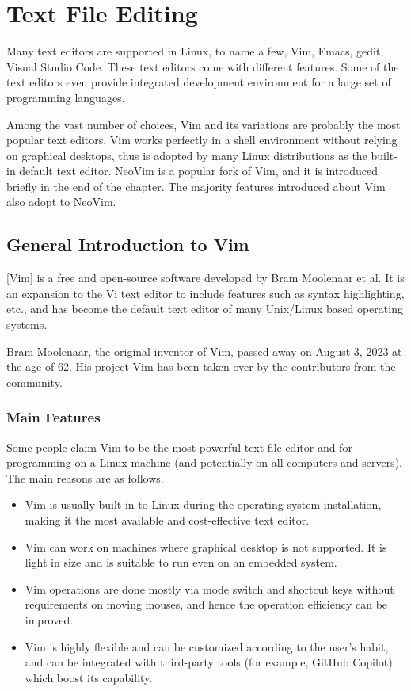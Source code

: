 \chapter{Text File Editing} \label{ch:tfe}

Many text editors are supported in Linux, to name a few, Vim, Emacs, gedit, Visual Studio Code. These text editors come with different features. Some of the text editors even provide integrated development environment for a large set of programming languages.

Among the vast number of choices, Vim and its variations are probably the most popular text editors. Vim works perfectly in a shell environment without relying on graphical desktops, thus is adopted by many Linux distributions as the built-in default text editor. NeoVim is a popular fork of Vim, and it is introduced briefly in the end of the chapter. The majority features introduced about Vim also adopt to NeoVim.

\section{General Introduction to Vim}

[Vim] is a free and open-source software developed by Bram Moolenaar et al. It is an expansion to the Vi text editor to include features such as syntax highlighting, etc., and has become the default text editor of many Unix/Linux based operating systems.

Bram Moolenaar, the original inventor of Vim, passed away on August 3, 2023 at the age of 62. His project Vim has been taken over by the contributors from the community. 

\subsection{Main Features}

Some people claim Vim to be the most powerful text file editor and  for programming on a Linux machine (and potentially on all computers and servers). The main reasons are as follows.
\begin{itemize}
  \item Vim is usually built-in to Linux during the operating system installation, making it the most available and cost-effective text editor.
  \item Vim can work on machines where graphical desktop is not supported. It is light in size and is suitable to run even on an embedded system.
  \item Vim operations are done mostly via mode switch and shortcut keys without requirements on moving mouses, and hence the operation efficiency can be improved.
  \item Vim is highly flexible and can be customized according to the user's habit, and can be integrated with third-party tools (for example, GitHub Copilot) which boost its capability.
\end{itemize}

